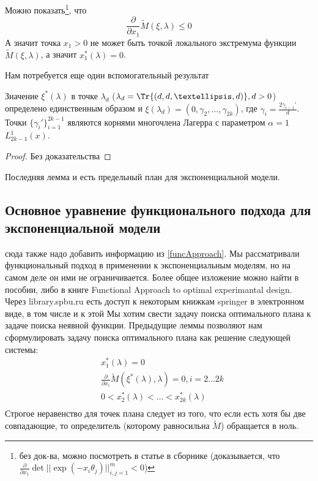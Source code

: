 Можно показать\footnote{без док-ва, можно посмотреть в статье в сборнике (доказывается, что $\frac{\partial}{\partial x_1} \det ||\exp(-x_i\theta_j)||_{i,j=1}^m < 0$)}, что 
$$\frac{\partial}{\partial x_1} \tilde{M}(\xi, \lambda) \leq 0$$
А значит точка $x_1 > 0$ не может быть точкой локального экстремума функции $\tilde{M}(\xi, \lambda)$, а значит $x_1^{*}(\lambda) = 0$. 

Нам потребуется еще один вспомогательный результат
\begin{lem}
Значение $\xi^{*}(\lambda)$ в точке $\lambda_d$ ($\lambda_d = \Tr{(d, d,…,d)}, d > 0$)  определено единственным образом и 
$\xi(\lambda_d) = (0, \gamma_2, …, \gamma_{2k})$, где $\gamma_i = \frac{2\gamma_{i-1}'}{d}$. Точки $\{ \gamma_i' \}_{i=1}^{2k-1}$ являются корнями многочлена Лагерра с параметром $\alpha = 1$ $L_{2k-1}^1(x)$.  
\end{lem}
\begin{proof}
Без доказательства
\end{proof}
Последняя лемма и есть предельный план для экспоненциальной модели. 

\subsection{Основное уравнение функционального подхода для экспоненциальной модели}
{\color{blue} сюда также надо добавить информацию из \ref{funcApproach}. Мы рассматривали функциональный подход в применении к экспоненциальным моделям, но на самом деле он ими не ограничивается. Более общее изложение можно найти в пособии, либо в книге Functional Approach to optimal experimantal design. 
Через library.spbu.ru есть доступ к некоторым книжкам springer в электронном виде, в том числе и к этой}
Мы хотим свести задачу поиска оптимального плана к задаче поиска неявной функции. Предыдущие леммы позволяют нам сформулировать задачу поиска оптимального плана как решение следующей системы:
\begin{equation}
\label{functionalExpModel}
\begin{split}
&x_1^{*}(\lambda)=0 \\
&\frac{\partial}{\partial x_i}\tilde{M}(\xi^{*}(\lambda), \lambda) = 0, i = 2…2k \\
& 0 < x_2^{*}(\lambda) < … < x_{2k}^{*}(\lambda)\\
\end{split}
\end{equation}
Строгое неравенство для точек плана следует из того, что если есть хотя бы две совпадающие, то определитель (которому равносильна $\tilde{M}$) обращается в ноль. 

